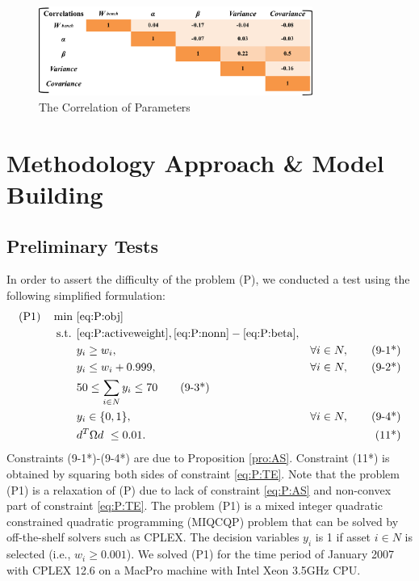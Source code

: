 \documentclass[11pt]{article}
\begin{document}
		\begin{figure}[] 
		\begin{center}
			\includegraphics[width=0.8\textwidth]{cor}
			\caption{ The Correlation of Parameters } \label{fig:cor}
		\end{center}
	\end{figure}
	

\section*{Methodology Approach {\&} Model Building}
\setcounter{subsection}{0}


\subsection{Preliminary Tests}

In order to assert the difficulty of the problem (P), we conducted a test using the following simplified formulation:
\begin{align*}
\text{(P1)} \quad \min~ &\eqref{eq:P:obj}\\
\text{s.t. } 
& \eqref{eq:P:activeweight}, \eqref{eq:P:nonn} - \eqref{eq:P:beta}, \notag\\
& y_i \geq w_i, & \forall i \in N, \tag{9-1*}\\
& y_i \leq w_i + 0.999, & \forall i \in N, \tag{9-2*}\\
& 50 \leq \sum_{i \in N} y_i \leq 70 \tag{9-3*}\\
& y_i \in \{0,1\}, & \forall i \in N, \tag{9-4*}\\
&  d^T \Omega  d \  \leq 0.01. & \tag{11*}
\end{align*} 
Constraints (9-1*)-(9-4*) are due to Proposition \ref{pro:AS}. Constraint (11*) is obtained by squaring both sides of constraint \eqref{eq:P:TE}. Note that the problem (P1) is a relaxation of (P) due to lack of constraint \eqref{eq:P:AS} and non-convex part of constraint \eqref{eq:P:TE}. The problem (P1) is a mixed integer quadratic constrained quadratic programming (MIQCQP) problem that can be solved by off-the-shelf solvers such as CPLEX. The decision variables $y_i$ is 1 if asset $i \in N$ is selected (i.e., $w_i \ge 0.001$). We solved (P1) for the time period of January 2007 with CPLEX 12.6 on a MacPro machine with Intel Xeon 3.5GHz CPU. 
\end{document}
